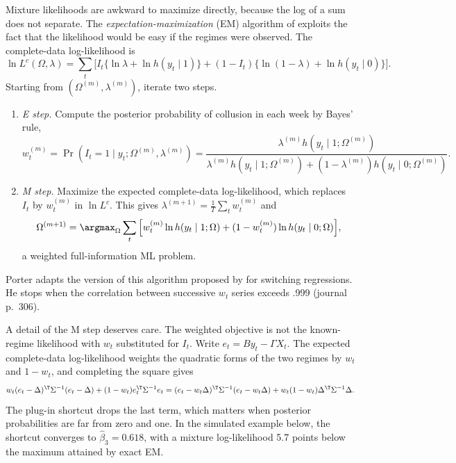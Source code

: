 Mixture likelihoods are awkward to maximize directly, because the log of a sum does not separate. The
\emph{expectation-maximization} (EM) algorithm of \citet{DempsterLairdRubin1977} exploits the fact that the likelihood
would be easy if the regimes were observed. The complete-data log-likelihood is
\begin{equation*}
  \ln L^c(\Omega, \lambda) = \sum_t\Big[I_t\{\ln\lambda + \ln h(y_t \mid 1)\} + (1 - I_t)\{\ln(1 - \lambda) + \ln h(y_t \mid 0)\}\Big].
\end{equation*}
Starting from $(\Omega^{(m)}, \lambda^{(m)})$, iterate two steps.
\begin{enumerate}
  \item \emph{E step.} Compute the posterior probability of collusion in each week by Bayes' rule,
  \begin{equation}\label{eq:A-estep}
    w_t^{(m)} = \Pr(I_t = 1 \mid y_t;\Omega^{(m)}, \lambda^{(m)}) =
    \frac{\lambda^{(m)}h(y_t \mid 1;\Omega^{(m)})}{\lambda^{(m)}h(y_t \mid 1;\Omega^{(m)}) + (1 - \lambda^{(m)})h(y_t \mid 0;\Omega^{(m)})}.
  \end{equation}
  \item \emph{M step.} Maximize the expected complete-data log-likelihood, which replaces $I_t$ by $w_t^{(m)}$ in
  $\ln L^c$. This gives $\lambda^{(m+1)} = \frac{1}{T}\sum_tw_t^{(m)}$ and
  \begin{equation*}
    \Omega^{(m+1)} = \argmax_\Omega\sum_t\Big[w_t^{(m)}\ln h(y_t \mid 1;\Omega) + (1 - w_t^{(m)})\ln h(y_t \mid 0;\Omega)\Big],
  \end{equation*}
  a weighted full-information ML problem.
\end{enumerate}
Porter adapts the version of this algorithm proposed by \citet{Kiefer1980} for switching regressions. He stops when the
correlation between successive $w_t$ series exceeds .999 (journal p.~306).

A detail of the M step deserves care. The weighted objective is not the known-regime likelihood with $w_t$ substituted for
$I_t$. Write $e_t = By_t - \Gamma X_t$. The expected complete-data log-likelihood weights the quadratic forms of the two
regimes by $w_t$ and $1 - w_t$, and completing the square gives
\begin{equation*}
  w_t(e_t - \Delta)^\T\Sigma^{-1}(e_t - \Delta) + (1 - w_t)e_t^\T\Sigma^{-1}e_t
  = (e_t - w_t\Delta)^\T\Sigma^{-1}(e_t - w_t\Delta) + w_t(1 - w_t)\Delta^\T\Sigma^{-1}\Delta.
\end{equation*}
The plug-in shortcut drops the last term, which matters when posterior probabilities are far from zero and one. In the
simulated example below, the shortcut converges to $\hat\beta_3 = 0.618$, with a mixture log-likelihood 5.7 points below the
maximum attained by exact EM.


